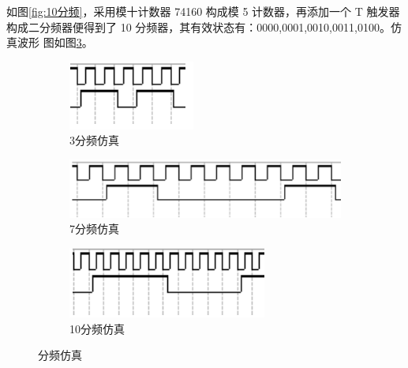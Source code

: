 \documentclass[twoside, openright]{article}
\begin{document}
如图\ref{fig:10分频}，采用模十计数器 74160 构成模 5 计数器，再添加一个 T 触发器
构成二分频器便得到了 10 分频器，其有效状态有：0000,0001,0010,0011,0100。仿真波形
图如图\ref{fig:10分频仿真}。

\begin{figure}[htbp]
	\centering
	\begin{subfigure}[htbp]{.31\linewidth}
		\centering
		\includegraphics[width = \linewidth]{3-2.png}
		\caption{3分频仿真}
		\label{fig:3分频仿真}
	\end{subfigure}
	\quad
	\begin{subfigure}[htbp]{.31\linewidth}
		\centering
		\includegraphics[width = \linewidth]{7-2.png}
		\caption{7分频仿真}
		\label{fig:7分频仿真}
	\end{subfigure}
	\quad
	\begin{subfigure}[htbp]{.31\linewidth}
		\centering
		\includegraphics[width = \linewidth]{10-2.png}
		\caption{10分频仿真}
		\label{fig:10分频仿真}
	\end{subfigure}
	\caption{分频仿真}
	\label{fig:分频仿真}
\end{figure}
\end{document}
